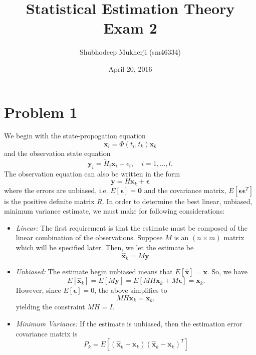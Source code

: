 \documentclass[11pt]{article}
\title{Statistical Estimation Theory Exam 2}
\author{Shubhodeep Mukherji (sm46334)} \date{April 20, 2016}
\begin{document}
\maketitle

\section*{Problem 1}

We begin with the state-propogation equation
\begin{equation*}
\textbf{x}_i = \Phi (t_i, t_k) \textbf{x}_k
\end{equation*}
and the observation state equation
\begin{equation*}
\textbf{y}_i = \tilde{H}_i \textbf{x}_i + \epsilon_i, \quad i=1,\dots,l.
\end{equation*}
The observation equation can also be written in the form
\begin{equation*}
\textbf{y} = H \textbf{x}_k + \mathbf{\epsilon}
\end{equation*}
where the errors are unbiased, i.e. $E[\mathbf{\epsilon}]=\textbf{0}$ and the covariance matrix, $E[\mathbf{\epsilon} \mathbf{\epsilon}^T ]$ is the positive definite matrix $R$.  In order to determine the best linear, unbiased, minimum variance estimate, we must make for following considerations:
\begin{itemize}
\item \textit{Linear:} The first requirement is that the estimate must be composed of the linear combination of the observations.  Suppose $M$ is an $(n \times m)$ matrix which will be specified later.  Then, we let the estimate be
\begin{equation*}
\hat{\textbf{x}}_k = M \textbf{y}.
\end{equation*}

\item \textit{Unbiased:} The estimate begin unbiased means that $E [\hat{\mathbf{x}} ] = \textbf{x}$.  So, we have
\begin{equation*}
E[\hat{\textbf{x}}_k] = E[M\textbf{y}] = E[MH\textbf{x}_k + M \mathbf{\epsilon} ] = \textbf{x}_k.
\end{equation*}
However, since $E[\mathbf{\epsilon}]=0$, the above simplifies to
\[MH \textbf{x}_k = \textbf{x}_k, \]
yielding the constraint $MH=I$.

\item \textit{Minimum Variance:} If the estimate is unbiased, then the estimation error covariance matrix is
\[P_k = E \left[ ( \hat{\mathbf{x}}_k - \mathbf{x}_k )( \hat{\mathbf{x}}_k - \mathbf{x}_k )^T  \right] \]
\end{itemize}
\end{document}
